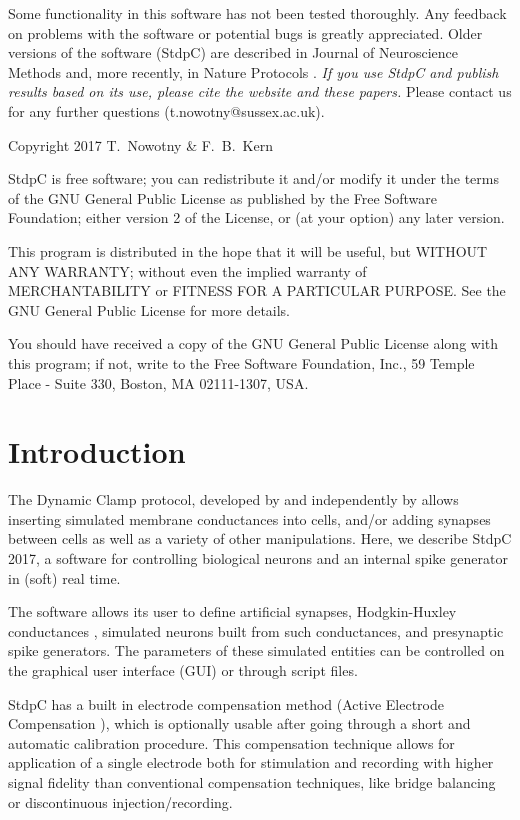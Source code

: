 \documentclass{article}
\begin{document}
Some functionality in this software has
not been tested thoroughly. Any feedback on problems with the
software or potential bugs is greatly appreciated.  Older versions
of the software (StdpC) are described in Journal of Neuroscience
Methods \cite{Nowotny2006} and, more recently, in Nature Protocols 
\cite{Kemenes2011}. {\em If you use StdpC and publish results
based on its use, please cite the website and these papers.} Please
contact us for any further questions (t.nowotny@sussex.ac.uk).

Copyright 2017 T.~Nowotny \& F.~B.~Kern

StdpC is free software; you can redistribute it and/or modify  
it under the terms of the GNU General Public License as published by 
the Free Software Foundation; either version 2 of the License, or 
(at your option) any later version.                               

This program is distributed in the hope that it will be useful,
but WITHOUT ANY WARRANTY; without even the implied warranty of
MERCHANTABILITY or FITNESS FOR A PARTICULAR PURPOSE.  See the 
GNU General Public License for more details.

You should have received a copy of the GNU General Public License
along with this program; if not, write to the
Free Software Foundation, Inc., 59 Temple Place - Suite 330, Boston,
MA  02111-1307, USA.

\newpage
\section{Introduction}
           
The Dynamic Clamp protocol, developed by \cite{Sharp1993} and
independently by \cite{Robinson1993} allows inserting simulated
membrane conductances into cells, and/or adding synapses between cells
as well as a variety of other manipulations. Here, we describe StdpC
2017, a software for controlling biological neurons and an internal
spike generator in (soft) real time.

The software allows its user to define artificial synapses, Hodgkin-Huxley conductances
\cite{Hodgkin1949}, simulated neurons built from such conductances, and
presynaptic spike generators. The parameters of these simulated
entities can be controlled on the graphical user interface (GUI) or
through script files.  

StdpC has a built in electrode compensation method (Active
Electrode Compensation \cite{Brette2008}), which is optionally usable after
going through a short and automatic calibration procedure. This
compensation technique allows for application of a single electrode both
for stimulation and recording with higher signal fidelity than conventional
compensation techniques, like bridge balancing or discontinuous
injection/recording. 
\end{document}

